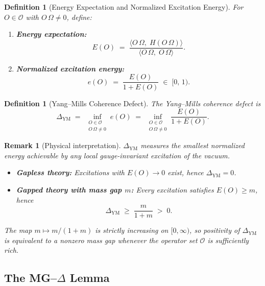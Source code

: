 \documentclass[11pt]{article}
\newtheorem{definition}[theorem]{Definition}
\newtheorem{remark}[theorem]{Remark}
\begin{document}
\begin{definition}[Energy Expectation and Normalized Excitation Energy]
\label{def:energy-functionals}
For $O \in \mathcal{O}$ with $O\,\Omega \neq 0$, define:
\begin{enumerate}
\item \textbf{Energy expectation:}
      \[
        E(O)
        \;=\;
        \frac{\langle O\,\Omega,\; H(O\,\Omega)\rangle}
             {\langle O\,\Omega,\; O\,\Omega\rangle} .
      \]
\item \textbf{Normalized excitation energy:}
      \[
        e(O)
        \;=\;
        \frac{E(O)}{1 + E(O)}
        \;\in\; [0,\,1) .
      \]
\end{enumerate}
\end{definition}

\begin{definition}[Yang--Mills Coherence Defect]
\label{def:delta-ym}
The \emph{Yang--Mills coherence defect} is
\[
  \boxed{\;
  \Delta_{\mathrm{YM}}
  \;=\;
  \inf_{\substack{O \in \mathcal{O} \\[2pt] O\,\Omega \neq 0}}
  e(O)
  \;=\;
  \inf_{\substack{O \in \mathcal{O} \\[2pt] O\,\Omega \neq 0}}
  \frac{E(O)}{1 + E(O)} .
  \;}
\]
\end{definition}

\begin{remark}[Physical interpretation]
\label{rem:delta-interpretation}
$\Delta_{\mathrm{YM}}$ measures the smallest normalized energy
achievable by \emph{any} local gauge-invariant excitation of the
vacuum.
\begin{itemize}
\item \textbf{Gapless theory:}
      Excitations with $E(O) \to 0$ exist, hence
      $\Delta_{\mathrm{YM}} = 0$.
\item \textbf{Gapped theory with mass gap $m$:}
      Every excitation satisfies $E(O) \geq m$, hence
      \[
        \Delta_{\mathrm{YM}}
        \;\geq\;
        \frac{m}{1+m}
        \;>\; 0 .
      \]
\end{itemize}
The map $m \mapsto m/(1+m)$ is strictly increasing on
$[0,\infty)$, so positivity of $\Delta_{\mathrm{YM}}$ is
\emph{equivalent} to a nonzero mass gap whenever the operator set
$\mathcal{O}$ is sufficiently rich.
\end{remark}

\subsection{The MG--$\Delta$ Lemma}
\end{document}
